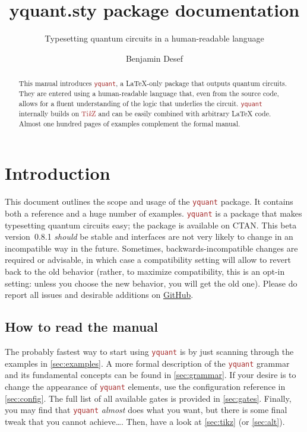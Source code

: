 \documentclass{scrartcl}
\title{yquant.sty package documentation}
\subtitle{Typesetting quantum circuits in a human-readable language}
\author{Benjamin Desef}
\makeatletter
\def\TikZ{\textcolor{brown}{Ti\textit kZ}}
\def\pkg#1{\textcolor{brown}{\texttt{#1}}}
\def\Yquant{\pkg{yquant}}
\newcommand*{\the@orig@section}{}
\let\the@orig@section=\section
\renewcommand*{\section}{%
   \clearpage%
   \the@orig@section%
}
\makeatother
\begin{document}
   \maketitle
   \begin{abstract}
      \noindent This manual introduces \Yquant, a \LaTeX\hyp only package that outputs quantum circuits.
      They are entered using a human\hyp readable language that, even from the source code, allows for a fluent understanding of the logic that underlies the circuit.
      \Yquant{} internally builds on \TikZ{} and can be easily combined with arbitrary \LaTeX{} code.
      Almost one hundred pages of examples complement the formal manual.
   \end{abstract}
   \tableofcontents

   \section{Introduction}
      This document outlines the scope and usage of the \Yquant{} package.
      It contains both a reference and a huge number of examples.
      \Yquant{} is a package that makes typesetting quantum circuits easy; the package is available on CTAN.
      This beta version~0.8.1 \emph{should} be stable and interfaces are not very likely to change in an incompatible way in the future.
      Sometimes, backwards\hyp incompatible changes are required or advisable, in which case a compatibility setting will allow to revert back to the old behavior (rather, to maximize compatibility, this is an opt\hyp in setting: unless you choose the new behavior, you will get the old one).
      Please do report all issues and desirable additions on \href{https://github.com/projekter/yquant/issues}{GitHub}.

      \subsection{How to read the manual}
         The probably fastest way to start using \Yquant{} is by just scanning through the examples in \cref{sec:examples}.
         A more formal description of the \Yquant{} grammar and its fundamental concepts can be found in \cref{sec:grammar}.
         If your desire is to change the appearance of \Yquant{} elements, use the configuration reference in \cref{sec:config}.
         The full list of all available gates is provided in \cref{sec:gates}.
         Finally, you may find that \Yquant{} \emph{almost} does what you want, but there is some final tweak that you cannot achieve\dots.
         Then, have a look at \cref{sec:tikz} (or \cref{sec:alt}).
\end{document}
